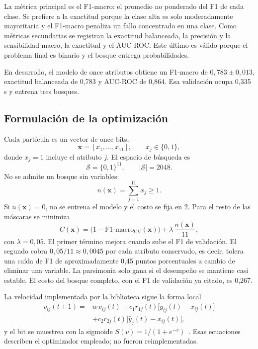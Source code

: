 \documentclass[conference]{IEEEtran}
\begin{document}
La métrica principal es el F1-macro: el promedio no ponderado del F1 de cada clase. Se prefiere a la exactitud porque la clase alta es solo moderadamente mayoritaria y el F1-macro penaliza un fallo concentrado en una clase. Como métricas secundarias se registran la exactitud balanceada, la precisión y la sensibilidad macro, la exactitud y el AUC-ROC. Este último es válido porque el problema final es binario y el bosque entrega probabilidades.

En desarrollo, el modelo de once atributos obtiene un F1-macro de $0{,}783 \pm 0{,}013$, exactitud balanceada de 0,783 y AUC-ROC de 0,864. Esa validación ocupa 0,335\,s y entrena tres bosques.

\subsection{Formulación de la optimización}
Cada partícula es un vector de once bits,
\begin{equation}
\mathbf{x}=[x_1,\ldots,x_{11}], \qquad x_j \in \{0,1\},
\label{eq:particula}
\end{equation}
donde $x_j=1$ incluye el atributo $j$. El espacio de búsqueda es
\begin{equation}
\mathcal{S}=\{0,1\}^{11}, \qquad |\mathcal{S}|=2048.
\label{eq:espacio}
\end{equation}
No se admite un bosque sin variables:
\begin{equation}
n(\mathbf{x})=\sum_{j=1}^{11} x_j \geq 1.
\label{eq:restriccion}
\end{equation}
Si $n(\mathbf{x})=0$, no se entrena el modelo y el costo se fija en 2. Para el resto de las máscaras se minimiza
\begin{equation}
C(\mathbf{x})=
\bigl(1-\mathrm{F1\text{-}macro_{CV}}(\mathbf{x})\bigr)
+\lambda\,\frac{n(\mathbf{x})}{11},
\label{eq:costo}
\end{equation}
con $\lambda=0{,}05$. El primer término mejora cuando sube el F1 de validación. El segundo cobra $0{,}05/11 \approx 0{,}0045$ por cada atributo conservado, es decir, tolera una caída de F1 de aproximadamente 0,45 puntos porcentuales a cambio de eliminar una variable. La parsimonia solo gana si el desempeño se mantiene casi estable. El costo del bosque completo, con el F1 de validación ya citado, es 0,267.

La velocidad implementada por la biblioteca sigue la forma local
\begin{equation}
\begin{aligned}
v_{ij}(t{+}1)={}& w\,v_{ij}(t)
+c_1 r_{1j}(t)\bigl[y_{ij}(t)-x_{ij}(t)\bigr]\\
&+c_2 r_{2j}(t)\bigl[\hat{y}_{j}(t)-x_{ij}(t)\bigr],
\end{aligned}
\label{eq:velocidad}
\end{equation}
y el bit se muestrea con la sigmoide $S(v)=1/(1+e^{-v})$~\cite{kennedy1997,miranda2018}. Esas ecuaciones describen el optimizador empleado; no fueron reimplementadas.
\end{document}
